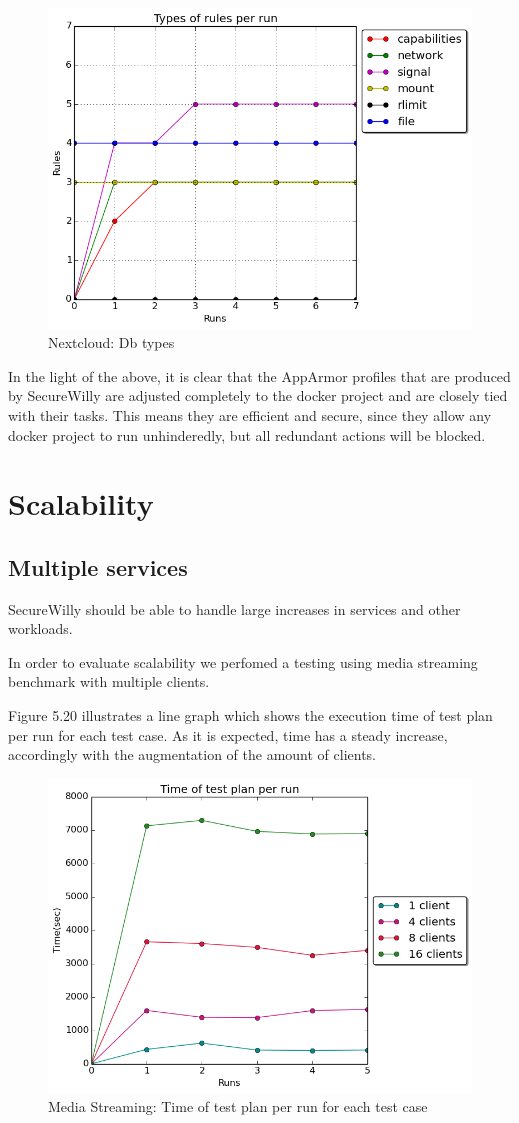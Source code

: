 \begin{figure}[h!]
  \centering
   \includegraphics[width=0.68\linewidth]{figures/nextcloud/types_db.png}
   \caption{Nextcloud: Db types}
\end{figure}
In the light of the above, it is clear that the AppArmor profiles that are produced by SecureWilly are adjusted completely to the docker project and are closely tied with their tasks. This means they are efficient and secure, since they allow any docker project to run unhinderedly, but all redundant actions will be blocked.\\

\section{Scalability}
\subsection{Multiple services}
SecureWilly should be able to handle large increases in services and other workloads. 

In order to evaluate scalability we perfomed a testing using media streaming benchmark with multiple clients.

Figure 5.20 illustrates a line graph which shows the execution time of test plan per run for each test case. As it is expected, time has a steady increase, accordingly with the augmentation of the amount of clients.

\begin{figure}[h!]
  \centering
   \includegraphics[width=0.8\linewidth]{figures/scalability/time1_4_8_16.png}
   \caption{Media Streaming: Time of test plan per run for each test case}
\end{figure}

